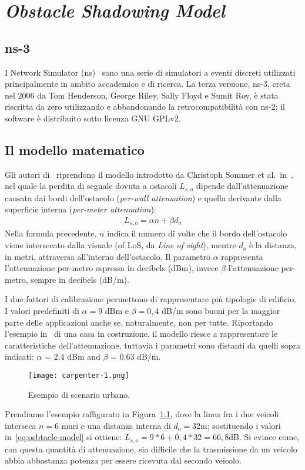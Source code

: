 %
\chapter{\textit{Obstacle Shadowing Model}}
\section{ns-3}
I Network Simulator (ns)~\cite{ns3Website} sono una serie di simulatori a eventi discreti utilizzati principalmente in ambito accademico e di ricerca.
La terza versione, ns-3, creta nel 2006 da Tom Henderson, George Riley, Sally Floyd e Sumit Roy, è stata riscritta da zero utilizzando \Cpp e abbandonando
la retrocompatibilità con ns-2; il software è distribuito sotto licenza GNU GPLv2.
%
\section{Il modello matematico}
Gli autori di~\cite{Carpenter:2015:OMI:2756509.2756512} riprendono il modello introdotto da Christoph Sommer et al.\ in~\cite{5720204},
nel quale la perdita di segnale dovuta a ostacoli $L_{s,o}$ dipende dall'attenuazione causata dai bordi dell'ostacolo (\textit{per-wall attenuation})
e quella derivante dalla superficie interna (\textit{per-meter attenuation}):
\begin{gather}\label{eq:osbtacle-model}
	L_{s,o} = \alpha n + \beta d_o
\end{gather}
Nella formula precedente, $n$ indica il numero di volte che il bordo dell'ostacolo viene intersecato dalla visuale (of LoS, da \textit{Line of sight}),
mentre $d_o$ è la distanza, in metri, attraversa all'interno dell'ostacolo.
Il parametro $\alpha$ rappresenta l'attenuazione per-metro espressa in decibels (dBm), invece
$\beta$ l'attenuazione per-metro, sempre in decibels (dB/m).

I due fattori di calibrazione permettono di rappresentare più tipologie di edificio.
I valori predefiniti di $\alpha = 9$ dBm e $\beta = 0,4$ dB/m sono buoni per la maggior parte delle applicazioni
anche se, naturalmente, non per tutte.
Riportando l'esempio in~\cite{5720204} di una casa in costruzione, il modello riesce a rappresentare le caratteristiche dell'attenuazione,
tuttavia i parametri sono distanti da quelli sopra indicati: $\alpha$ = 2.4 dBm and $\beta$ = 0.63 dB/m.
%
\begin{figure}[!h]
	\centering
	\begin{center}
		\texttt{[image: carpenter-1.png]}
	\end{center}
	\label{fig:scenario-urbano-1}\caption{Esempio di scenario urbano.}
\end{figure}
%
Prendiamo l'esempio raffigurato in Figura~\ref{fig:scenario-urbano-1}, dove la linea fra i due veicoli interseca $n=6$ muri e una distanza interna di $d_o=32$m;
sostituendo i valori in~\ref{eq:osbtacle-model} si ottiene: $L_{s,o} = 9*6 + 0,4*32 = 66,8$dB.
Si evince come, con questa quantità di attenuazione, sia difficile che la trasmissione da un veicolo abbia abbastanza potenza per essere ricevuta dal secondo veicolo.
%
